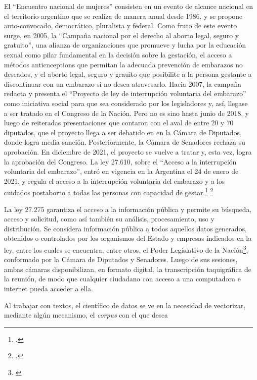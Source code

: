 El ``Encuentro nacional de mujeres'' consisten en un evento de alcance nacional
en el territorio argentino que se realiza de manera anual desde 1986, y se propone
auto-convocado, democrático, pluralista y federal.
Como fruto de este evento surge, en 2005, la ``Campaña nacional por el derecho al
aborto legal, seguro y gratuito'', una alianza de organizaciones que promueve y
lucha por la educación sexual como pilar fundamental en la decisión sobre la gestación,
el acceso a métodos anticnceptions que permitan la adecuada prevención de embarazos
no deseados, y el aborto legal, seguro y grauito que posibilite a la persona gestante
a discontinuar con un embarazo si no desea atravesarlo.
Hacia 2007, la campaña redacta y presenta el ``Proyecto de ley de interrupción
voluntaria del embarazo'' como iniciativa social para que sea considerado por los
legisladores y, así, llegase a ser tratado en el Congreso de la Nación.
Pero no es sino hasta junio de 2018, y luego de reiteradas presentaciones que contaron
con el aval de entre 20 y 70 diputados, que el proyecto llega a ser debatido en en la
Cámara de Diputados, donde logra media sanción.
Posteriormente, la Cámara de Senadores rechaza su aprobación.
En diciembre de 2021, el proyecto se vuelve a tratar y, esta vez, logra la aprobación
del Congreso.
La ley 27.610, sobre el ``Acceso a la interrupción voluntaria del embarazo'', entró
en vigencia en la Argentina el 24 de enero de 2021, y regula el acceso a la
interrupción voluntaria del embarazo y a los cuidados postaborto a todas
las personas con capacidad de gestar.\footnote{\citeauthor{campana@lalucha}.}
\footnote{\citeauthor{huesped@historia}.}
\par
La ley 27.275 garantiza el acceso a la información pública y permite su búsqueda,
acceso y solicitud, como así también su análisis, procesamiento, uso y distribución.
Se considera información pública a todos aquellos datos generados, obtenidos o
controlados por los organismos del Estado y empresas indicados en la ley, entre
los cuales se encuentra, entre otros, el Poder Legislativo de la
Nación\footnote{\citeauthor{minjusticia@accesoinfo}}, conformado por la Cámara
de Diputados y Senadores.
Luego de sus sesiones, ambas cámaras disponibilizan, en formato digital, la
transcripción taquigráfica de la reunión, de modo que cualquier ciudadano con
acceso a una computadora e internet pueda acceder a ella.
\par
Al trabajar con textos, el científico de datos se ve en la necesidad
de vectorizar, mediante algún mecanismo, el \textit{corpus} con el que desea
